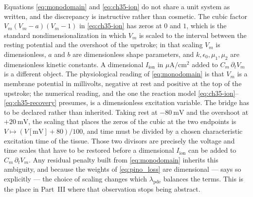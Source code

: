 \begin{remark}
\label{rem:ch35-units}
Equations \eqref{eq:monodomain} and \eqref{eq:ch35-ion} do not share a unit
system as written, and the discrepancy is instructive rather than cosmetic. The
cubic factor $V_m(V_m-a)(V_m-1)$ in \eqref{eq:ch35-ion} has zeros at $0$ and
$1$, which is the standard nondimensionalization in which $V_m$ is scaled to
the interval between the resting potential and the overshoot of the upstroke; in
that scaling $V_m$ is dimensionless, $a$ and $b$ are dimensionless shape
parameters, and $k,\epsilon_0,\mu_1,\mu_2$ are dimensionless kinetic constants.
A dimensional $I_{\text{ion}}$ in $\mu\text{A}/\text{cm}^2$ added to
$C_m\,\partial_t V_m$ is a different object. The physiological reading of
\eqref{eq:monodomain} is
that $V_m$ is a membrane potential in millivolts, negative at rest and positive
at the top of the upstroke; the numerical reading, and the one the reaction
model \eqref{eq:ch35-ion}--\eqref{eq:ch35-recovery} presumes, is a
dimensionless excitation variable. The bridge has to be declared rather than
inherited. Taking rest at $-80\ \mathrm{mV}$ and the overshoot at $+20\ \mathrm{mV}$,
the scaling that places the zeros of the cubic at the two endpoints is
$V\mapsto(V[\mathrm{mV}]+80)/100$, and time must be divided by a chosen
characteristic excitation time of the tissue. Those two divisors are precisely
the voltage and time scales that
have to be restored before a dimensional $I_{\text{ion}}$ can be added to
$C_m\,\partial_t V_m$. Any residual penalty built
from \eqref{eq:monodomain} inherits this ambiguity, and because the weights of
\eqref{eq:pino_loss} are dimensional --- 
says so explicitly --- the choice of scaling changes which $\lambda_{\text{pde}}$
balances the terms. This is the place in Part~III where that observation stops
being abstract.
\end{remark}

